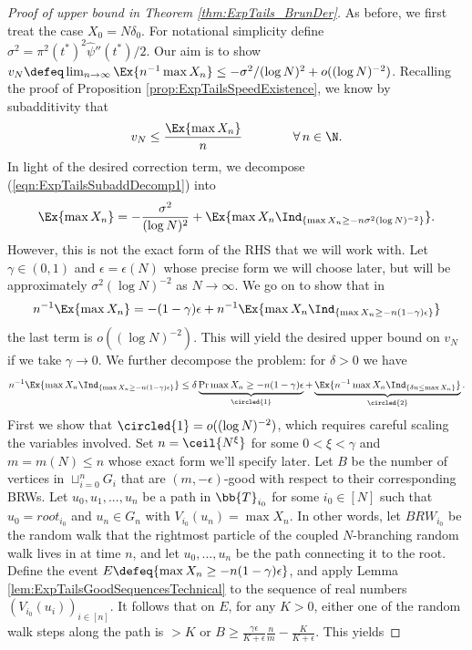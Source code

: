 \begin{proof}[Proof of upper bound in Theorem \ref{thm:ExpTails_BrunDer}]
As before, we first treat the case $X_0 = N \delta_0$. For notational simplicity define $\sigma^2 = \pi^2 (t^*)^2 \widehat{\psi}''(t^*) / 2$. Our aim is to show $v_N \defeq \lim_{n \to \infty} \Ex{n^{-1} \max X_n} \leq -  \sigma^2 / (\log N)^2 + o((\log N)^{-2})$. Recalling the proof of Proposition \ref{prop:ExpTailsSpeedExistence}, we know by subadditivity that
\begin{equation}\label{eqn:ExpTailsSubaddDecomp1}
v_N \leq \frac{\Ex{\max X_n}}{n} \qquad\qquad\forall\, n \in \N. 
\end{equation}
In light of the desired correction term, we decompose (\ref{eqn:ExpTailsSubaddDecomp1}) into
\begin{equation}
\Ex{\max X_n} = - \frac{\sigma^2}{(\log N)^2} + \Ex{\max X_n \Ind_{\{\max X_n \geq -n \sigma^2 (\log N)^{-2} \}}}. 
\end{equation}
However, this is not the exact form of the RHS that we will work with. Let $\gamma \in (0,1)$ and $\epsilon = \epsilon(N)$ whose precise form we will choose later, but will be approximately $\sigma^2 (\log N)^{-2}$ as $N \to \infty$. We go on to show that in
\begin{equation}
n^{-1} \Ex{\max X_n} =  - (1 - \gamma)\epsilon + n^{-1} \Ex{\max X_n \Ind_{\{\max X_n \geq  -n (1 - \gamma) \epsilon \}}}
\end{equation}
the last term is $o((\log N)^{-2})$. This will yield the desired upper bound on $v_N$ if we take $\gamma \to 0$. We further decompose the problem: for $\delta > 0$ we have
\begin{equation}
n^{-1} \Ex{\max X_n \Ind_{\{\max X_n \geq - n (1 - \gamma)\epsilon \}}} \leq \delta\underbrace{\Pr{\max X_n \geq -n (1 - \gamma)\epsilon }}_{\circled{1}} + \underbrace{\Ex{n^{-1} \max X_n \Ind_{\{ \delta n \leq \max X_n \}}}}_{\circled{2}}. \label{eqn:ExpTailsSubaddDecomp2} 
\end{equation}
First we show that $\circled{1} = o((\log N)^{-2})$, which requires careful scaling the variables involved. Set $n = \ceil{N^\xi}$ for some $0 < \xi < \gamma$ and $m = m(N) \leq n$ whose exact form we'll specify later. Let $B$ be the number of vertices in $\sqcup_{i=0}^n G_i$ that are $(m, - \epsilon)$-good with respect to their corresponding BRWs. Let $u_0, u_1, ..., u_n$ be a path in $\bb{T}_{i_0}$ for some $i_0 \in [N]$ such that $u_0 = root_{i_0}$ and $u_n \in G_n$ with $V_{i_0}(u_n) = \max X_n$. In other words, let $BRW_{i_0}$ be the random walk that the rightmost particle of the coupled $N$-branching random walk lives in at time $n$, and let $u_0, ..., u_n$ be the path connecting it to the root. Define the event $E \defeq \{ \max X_n \geq - n (1 - \gamma)\epsilon \}$, and apply Lemma \ref{lem:ExpTailsGoodSequencesTechnical} to the sequence of real numbers $(V_{i_0}(u_i))_{i \in [n]}$. It follows that on $E$, for any $K > 0$, either one of the random walk steps along the path is $> K$ or $B \geq \frac{\gamma\epsilon}{K + \epsilon}\frac{n}{m} - \frac{K}{K + \epsilon}$. This yields

\end{proof}
